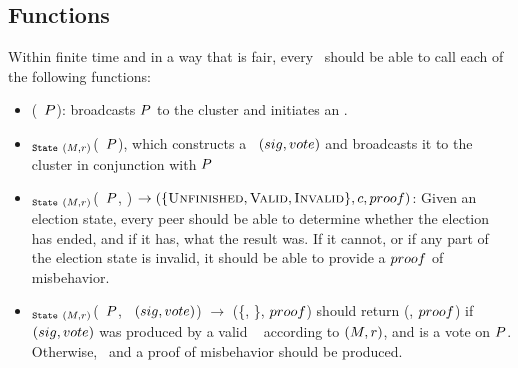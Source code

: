 \subsection{Functions}
Within finite time and in a way that is fair, every \KwPeer~should be able
to call each of the following functions:
\begin{itemize}
  \item \NamePropose(\StructPetition~$P$): broadcasts $P$
    to the cluster and initiates an \StructElection.
  \item \NameVote$_{\texttt{State}~(M, r)}$(\StructPetition~$P$), which
    constructs a \StructBallot~$(sig, vote)$ and broadcasts it to the cluster in
    conjunction with $P$
  \item \NameEvaluate$_{\texttt{State}~(M, r)}$(\StructPetition~$P$,
    \SetVotes) $\to (\{\textsc{Unfinished}, \textsc{Valid}, \textsc{Invalid}\}, c,
    proof)$:
    Given an election state, every peer should be able to determine whether the
    election has ended, and if it has, what the result was. If it cannot, or if
    any part of the election state is invalid, it should be able to provide a
    $proof$ of misbehavior.
  \item \NameEvaluate$_{\texttt{State}~(M, r)}$(\StructPetition~$P$,
    \StructBallot~$(sig, vote)$) $\to$ (\{\AtomTrue, \AtomFalse\}, $proof$) should
    return (\AtomTrue, $proof$) if $(sig, vote)$ was produced by a valid \KwPeer~
    according to $(M, r)$, and is a vote on $P$. Otherwise,
    \AtomFalse~and a proof of misbehavior should be produced.
\end{itemize}

